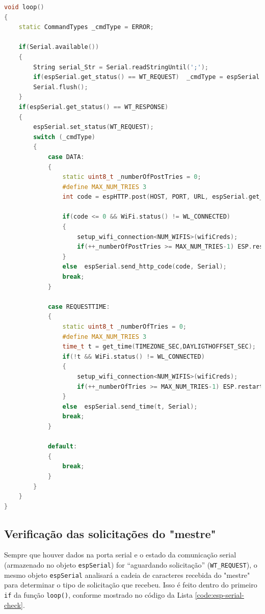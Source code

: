 \begin{lstlisting}[language=C++, caption=Laço principal do programa]
void loop() 
{
    static CommandTypes _cmdType = ERROR;

    if(Serial.available())
    { 
        String serial_Str = Serial.readStringUntil(';');
        if(espSerial.get_status() == WT_REQUEST)  _cmdType = espSerial.parse(serial_Str);
        Serial.flush();
    }
    if(espSerial.get_status() == WT_RESPONSE)
    {
        espSerial.set_status(WT_REQUEST);
        switch (_cmdType)
        {
            case DATA:
            {
                static uint8_t _numberOfPostTries = 0;
                #define MAX_NUM_TRIES 3
                int code = espHTTP.post(HOST, PORT, URL, espSerial.get_data());
                
                if(code <= 0 && WiFi.status() != WL_CONNECTED)
                {
                    setup_wifi_connection<NUM_WIFIS>(wifiCreds);
                    if(++_numberOfPostTries >= MAX_NUM_TRIES-1) ESP.restart();
                }
                else  espSerial.send_http_code(code, Serial);
                break;
            }

            case REQUESTTIME:
            {
                static uint8_t _numberOfTries = 0;
                #define MAX_NUM_TRIES 3
                time_t t = get_time(TIMEZONE_SEC,DAYLIGTHOFFSET_SEC);
                if(!t && WiFi.status() != WL_CONNECTED)
                {
                    setup_wifi_connection<NUM_WIFIS>(wifiCreds);
                    if(++_numberOfTries >= MAX_NUM_TRIES-1) ESP.restart();
                }
                else  espSerial.send_time(t, Serial);
                break;
            }
            
            default:
            {
                break;
            }
        }
    }
}
\end{lstlisting}
\label{code:esp-loop}

\subsection*{Verificação das solicitações do "mestre"}

Sempre que houver dados na porta serial e o estado da comunicação serial (armazenado no objeto \texttt{espSerial}) for “aguardando solicitação” (\texttt{WT\_REQUEST}), o mesmo objeto \texttt{espSerial} analisará a cadeia de caracteres recebida do "mestre" para determinar o tipo de solicitação que recebeu. Isso é feito dentro do primeiro \texttt{if} da função \texttt{loop()}, conforme mostrado no código da Lista \ref{code:esp-serial-check}.

